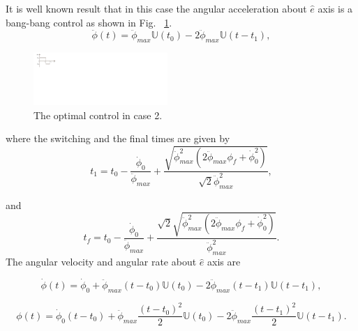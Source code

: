 \documentclass[journal ]{new-aiaa}
\begin{document}
	
	 It is well known result that in this case the angular acceleration about $\hat{e}$ axis is a bang-bang control as shown in Fig. ~\ref{bang_bang}.
	\begin{equation}\label{alpha}
	\ddot{\phi}(t)=\ddot{\phi}_{max}\mathbb{U}(t_0)- 2\ddot{\phi}_{max}\mathbb{U}(t-t_1),
	\end{equation}
	
	\begin{figure}[ht!]
	\centering
	\includegraphics[width=2in]{Bang_bang}    
	\caption{The optimal control in case 2.}  
	\label{bang_bang}
	\end{figure}
	where the switching and the final times are given by
	\begin{equation}
	t_1=t_0-\frac{\dot{\phi}_{0}}{\ddot{\phi}_{max}}+\frac{\sqrt{\ddot{\phi}_{max}^2(2\ddot{\phi}_{max}\phi_{f}+\dot{\phi}_{0}^2)}}{\sqrt{2}\ddot{\phi}_{max}^2},
	\end{equation}
	
	
	and
	\begin{equation}
	t_f=t_0-\frac{\dot{\phi}_{0}}{\ddot{\phi}_{max}}+\frac{\sqrt{2}\sqrt{\ddot{\phi}_{max}^2(2\ddot{\phi}_{max}\phi_{f}+\dot{\phi}_{0}^2)}}{\ddot{\phi}_{max}^2}.
	\end{equation}
The angular velocity and angular rate about $\hat{e}$ axis are

	\begin{equation}\label{omega}
	\dot{\phi}(t)=\dot{\phi}_{0}+\ddot{\phi}_{max}(t-t_0)\mathbb{U}(t_0)- 2\ddot{\phi}_{max}(t-t_1)\mathbb{U}(t-t_1),
	\end{equation}

	\begin{equation}\label{phi}
	\phi(t)=\dot{\phi}_{0}(t-t_0)+\ddot{\phi}_{max}\frac{(t-t_0)^2}{2}\mathbb{U}(t_0)- 2\ddot{\phi}_{max}\frac{(t-t_1)^2}{2}\mathbb{U}(t-t_1).
	\end{equation}
	
\end{document}
